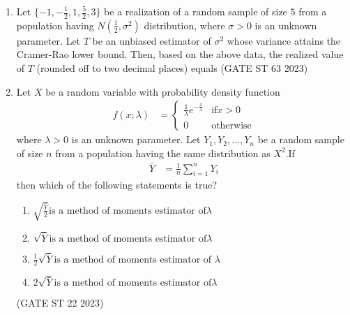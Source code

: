 \begin{enumerate}[label=\thechapter.\arabic*,ref=\thechapter.\theenumi]
\item Let $\{-1, -\frac{1}{2}, 1, \frac{5}{2}, 3\}$ be a realization of a random sample of size $5$ from a population having $N\left(\frac{1}{2}, \sigma^2\right)$ distribution, where $\sigma > 0$ is an unknown parameter. Let $T$ be an unbiased estimator of $\sigma^2$ whose variance attains the Cramer-Rao lower bound. Then, based on the above data, the realized value of $T$ (rounded off to two decimal places) equals
\hfill (GATE ST 63 2023)

\item Let $X$ be a random variable with probability density function
\begin{align}
\label{eq:22/2023/1}f(x;\lambda)&=
\begin{cases}
\frac{1}{\lambda}e^{-\frac{x}{\lambda}} & \text{if} x>0\\
0 & \text{otherwise}
\end{cases}
\end{align}
where $\lambda > 0$ is an unknown parameter. Let $Y_1, Y_2,...,Y_n$ be a random sample of
size $n$ from a population having the same distribution as $X^2$.If
\begin{align}
\label{eq:22/2023/2}\bar{Y} &= \frac{1}{n}\sum_{i=1}^n Y_i
\end{align}
then which of the following statements is true?
\begin{enumerate}
\item \label{eq:22/2023/3}$\sqrt{\frac{\bar{Y}}{2}} \text{is a method of moments estimator of}         \lambda$
\item $\sqrt{\bar{Y}} \text{is a method of moments estimator of}\lambda$
\item ${\frac{1}{2}\sqrt{\bar{Y}}} \text{is a method of moments estimator of }\lambda$
\item $2\sqrt{\bar{Y}} \text{is a method of moments estimator of} \lambda$
\end{enumerate}
\hfill(GATE ST 22 2023)\\

\end{enumerate}
